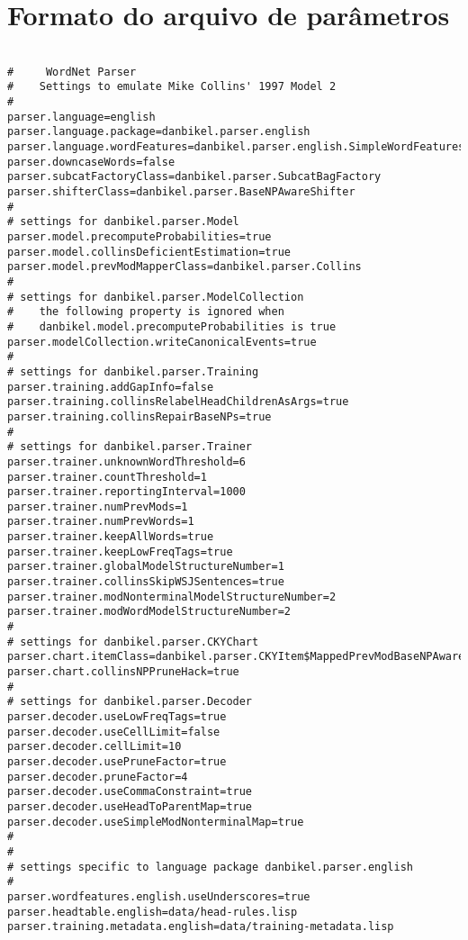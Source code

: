 \section{Formato do arquivo de parâmetros}
\label{sec:bikel_formato_aqrquivo}


\scriptsize
\begin{verbatim}

#     WordNet Parser
#    Settings to emulate Mike Collins' 1997 Model 2
#
parser.language=english
parser.language.package=danbikel.parser.english
parser.language.wordFeatures=danbikel.parser.english.SimpleWordFeatures
parser.downcaseWords=false
parser.subcatFactoryClass=danbikel.parser.SubcatBagFactory
parser.shifterClass=danbikel.parser.BaseNPAwareShifter
#
# settings for danbikel.parser.Model
parser.model.precomputeProbabilities=true
parser.model.collinsDeficientEstimation=true
parser.model.prevModMapperClass=danbikel.parser.Collins
#
# settings for danbikel.parser.ModelCollection
#    the following property is ignored when
#    danbikel.model.precomputeProbabilities is true
parser.modelCollection.writeCanonicalEvents=true
#
# settings for danbikel.parser.Training
parser.training.addGapInfo=false
parser.training.collinsRelabelHeadChildrenAsArgs=true
parser.training.collinsRepairBaseNPs=true
#
# settings for danbikel.parser.Trainer
parser.trainer.unknownWordThreshold=6
parser.trainer.countThreshold=1
parser.trainer.reportingInterval=1000
parser.trainer.numPrevMods=1
parser.trainer.numPrevWords=1
parser.trainer.keepAllWords=true
parser.trainer.keepLowFreqTags=true
parser.trainer.globalModelStructureNumber=1
parser.trainer.collinsSkipWSJSentences=true
parser.trainer.modNonterminalModelStructureNumber=2
parser.trainer.modWordModelStructureNumber=2
#
# settings for danbikel.parser.CKYChart
parser.chart.itemClass=danbikel.parser.CKYItem$MappedPrevModBaseNPAware
parser.chart.collinsNPPruneHack=true
#
# settings for danbikel.parser.Decoder
parser.decoder.useLowFreqTags=true
parser.decoder.useCellLimit=false
parser.decoder.cellLimit=10
parser.decoder.usePruneFactor=true
parser.decoder.pruneFactor=4
parser.decoder.useCommaConstraint=true
parser.decoder.useHeadToParentMap=true
parser.decoder.useSimpleModNonterminalMap=true
#
#
# settings specific to language package danbikel.parser.english
#
parser.wordfeatures.english.useUnderscores=true
parser.headtable.english=data/head-rules.lisp
parser.training.metadata.english=data/training-metadata.lisp
\end{verbatim}

\normalsize

